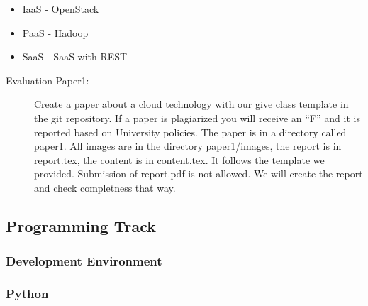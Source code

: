 \begin{itemize}
\item IaaS - OpenStack
\item PaaS - Hadoop
\item SaaS - SaaS with REST
\end{itemize}

\begin{description}
\item[Evaluation Paper1:] Create a paper about a cloud technology with
  our give class template in the git repository. If a paper is
  plagiarized you will receive an ``F'' and it is reported based on
  University policies. The paper is in a directory called paper1. All
  images are in the directory paper1/images, the report is in
  report.tex, the content is in content.tex. It follows the template
  we provided. Submission of report.pdf is not allowed. We will create
  the report and check completness that way.
\end{description}

\subsection{Programming Track}

\subsubsection{Development Environment}


\begin{comment}
\begin{description}
\item[Evaluation Experiment 1:] Create a virtual machine and take a
  photo with your laptop or computer and the virtual box running on
  the screen. Showcase the virtual box interface and in non full
  screen mode at the same time the operating system you run. We
  recommend yo use Ubuntu.
\end{description}
\end{comment}


\subsubsection{Python}


